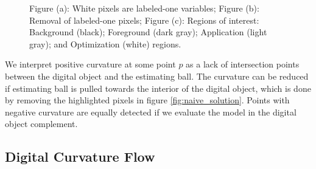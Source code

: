 \documentclass[runningheads]{llncs}
\begin{document}
	\begin{figure}[!ht]
		\center
		\hspace{40pt}
		\hspace{40pt}
		\caption{Figure (a): White pixels are labeled-one variables; Figure (b): Removal of labeled-one pixels; Figure (c): Regions of interest: Background (black); Foreground (dark gray); Application (light gray); and Optimization (white) regions.}	
					
	\end{figure}

We interpret positive curvature at some point $p$ as a lack of intersection points between the digital object and the estimating ball. The curvature can be reduced if estimating ball is pulled towards the interior of the digital object, which is done by removing the highlighted pixels in figure \ref{fig:naive_solution}. Points with negative curvature are equally detected if we evaluate the model in the digital object complement.

\subsection{Digital Curvature Flow}
\end{document}
